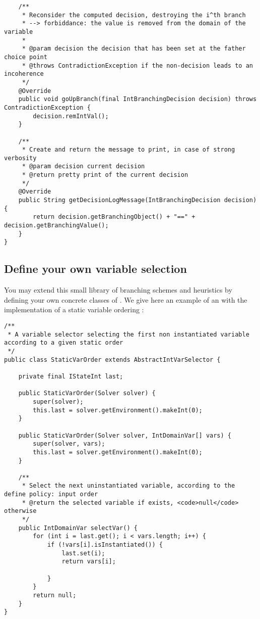 \begin{lstlisting}
    /**
     * Reconsider the computed decision, destroying the i^th branch
     * --> forbiddance: the value is removed from the domain of the variable
     * 
     * @param decision the decision that has been set at the father choice point
     * @throws ContradictionException if the non-decision leads to an incoherence
     */
    @Override
    public void goUpBranch(final IntBranchingDecision decision) throws ContradictionException {
        decision.remIntVal();
    }

    /**
     * Create and return the message to print, in case of strong verbosity
     * @param decision current decision
     * @return pretty print of the current decision
     */
    @Override
    public String getDecisionLogMessage(IntBranchingDecision decision) {
        return decision.getBranchingObject() + "==" + decision.getBranchingValue();
    }
}
\end{lstlisting}

\subsection{Define your own variable selection}\label{advanced:defineyourownvariableselection}\hypertarget{advanced:defineyourownvariableselection}{}


You may extend this small library of branching schemes and heuristics by defining your own concrete classes of . We give here an example of an  with the implementation of a static variable ordering :
\begin{lstlisting}
/**
 * A variable selector selecting the first non instantiated variable according to a given static order
 */
public class StaticVarOrder extends AbstractIntVarSelector {

    private final IStateInt last;

    public StaticVarOrder(Solver solver) {
        super(solver);
        this.last = solver.getEnvironment().makeInt(0);
    }

    public StaticVarOrder(Solver solver, IntDomainVar[] vars) {
        super(solver, vars);
        this.last = solver.getEnvironment().makeInt(0);
    }

    /**
     * Select the next uninstantiated variable, according to the define policy: input order
     * @return the selected variable if exists, <code>null</code> otherwise
     */
    public IntDomainVar selectVar() {
        for (int i = last.get(); i < vars.length; i++) {
            if (!vars[i].isInstantiated()) {
                last.set(i);
                return vars[i];

            }
        }
        return null;
    }
}
\end{lstlisting}

